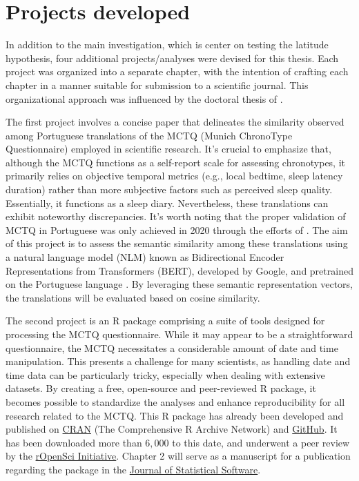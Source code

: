 \documentclass[
12pt,
openright,
oneside,
a4paper,
chapter=TITLE,
section=TITLE,
french,
spanish,
brazil,
english
]{abntex2}\usepackage{array}
\begin{document}
\section{Projects developed}\label{projects-developed}

In addition to the main investigation, which is center on testing the
latitude hypothesis, four additional projects/analyses were devised for
this thesis. Each project was organized into a separate chapter, with
the intention of crafting each chapter in a manner suitable for
submission to a scientific journal. This organizational approach was
influenced by the doctoral thesis of \textcite{reis2020}.

The first project involves a concise paper that delineates the
similarity observed among Portuguese translations of the MCTQ (Munich
ChronoType Questionnaire) employed in scientific research. It's crucial
to emphasize that, although the MCTQ functions as a self-report scale
for assessing chronotypes, it primarily relies on objective temporal
metrics (e.g., local bedtime, sleep latency duration) rather than more
subjective factors such as perceived sleep quality. Essentially, it
functions as a sleep diary. Nevertheless, these translations can exhibit
noteworthy discrepancies. It's worth noting that the proper validation
of MCTQ in Portuguese was only achieved in 2020 through the efforts of
\textcite{reis2020}. The aim of this project is to assess the semantic
similarity among these translations using a natural language model (NLM)
known as Bidirectional Encoder Representations from Transformers (BERT),
developed by Google, and pretrained on the Portuguese language
\autocite{devlin2018,souza2020}. By leveraging these semantic
representation vectors, the translations will be evaluated based on
cosine similarity.

The second project is an R package comprising a suite of tools designed
for processing the MCTQ questionnaire. While it may appear to be a
straightforward questionnaire, the MCTQ necessitates a considerable
amount of date and time manipulation. This presents a challenge for many
scientists, as handling date and time data can be particularly tricky,
especially when dealing with extensive datasets. By creating a free,
open-source and peer-reviewed R package, it becomes possible to
standardize the analyses and enhance reproducibility for all research
related to the MCTQ. This R package \autocite{vartanian2023} has already
been developed and published on
\href{https://cran.r-project.org/web/packages/mctq/index.html}{CRAN}
(The Comprehensive R Archive Network) and
\href{https://github.com/ropensci/mctq}{GitHub}. It has been downloaded
more than \(6,000\) to this date, and underwent a peer review by the
\href{https://ropensci.org/}{rOpenSci Initiative}. Chapter 2 will serve
as a manuscript for a publication regarding the package in the
\href{https://www.jstatsoft.org/authors}{Journal of Statistical
Software}.
\end{document}
